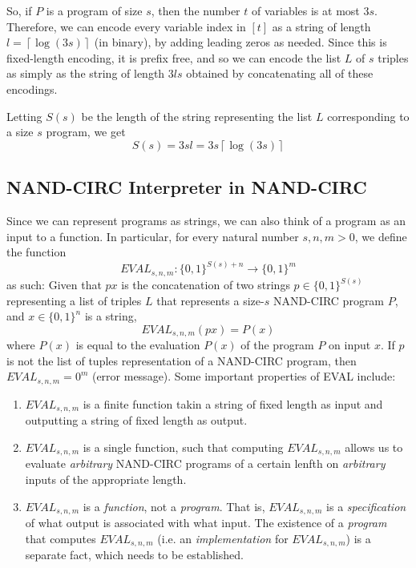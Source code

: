  So, if $P$ is a program of size $s$, then the number $t$ of variables is at most $3s$. Therefore, we can encode every variable index in $[t]$ as a string of length $l = \left\lceil{\log(3s)}\right\rceil$ (in binary), by adding leading zeros as needed. Since this is fixed-length encoding, it is prefix free, and so we can encode the list $L$ of $s$ triples as simply as the string of length $3ls$ obtained by concatenating all of these encodings. 

  Letting $S(s)$ be the length of the string representing the list $L$ corresponding to a size $s$ program, we get
  \[S(s) = 3sl = 3s \left\lceil{\log(3s)}\right\rceil\]

\subsection{NAND-CIRC Interpreter in NAND-CIRC}

  Since we can represent programs as strings, we can also think of a program as an input to a function. In particular, for every natural number $s, n, m > 0$, we define the function
  \[EVAL_{s, n, m} : \{0,1\}^{S(s) + n} \longrightarrow \{0,1\}^m\]
  as such: Given that $px$ is the concatenation of two strings $p \in \{0,1\}^{S(s)}$ representing a list of triples $L$ that represents a size-$s$ NAND-CIRC program $P$, and $x \in \{0,1\}^n$ is a string, 
  \[EVAL_{s, n, m} (px) = P(x)\]
  where $P(x)$ is equal to the evaluation $P(x)$ of the program $P$ on input $x$. If $p$ is not the list of tuples representation of a NAND-CIRC program, then $EVAL_{s, n, m} = 0^m$ (error message). Some important properties of EVAL include: 
  \begin{enumerate}
      \item $EVAL_{s, n, m}$ is a finite function takin a string of fixed length as input and outputting a string of fixed length as output. 
      \item $EVAL_{s, n, m}$ is a single function, such that computing $EVAL_{s, n, m}$ allows us to evaluate \textit{arbitrary} NAND-CIRC programs of a certain lenfth on \textit{arbitrary} inputs of the appropriate length. 
      \item $EVAL_{s, n, m}$ is a \textit{function}, not a \textit{program}. That is, $EVAL_{s, n, m}$ is a \textit{specification} of what output is associated with what input. The existence of a \textit{program} that computes $EVAL_{s, n, m}$ (i.e. an \textit{implementation} for $EVAL_{s, n, m}$) is a separate fact, which needs to be established. 
  \end{enumerate}


